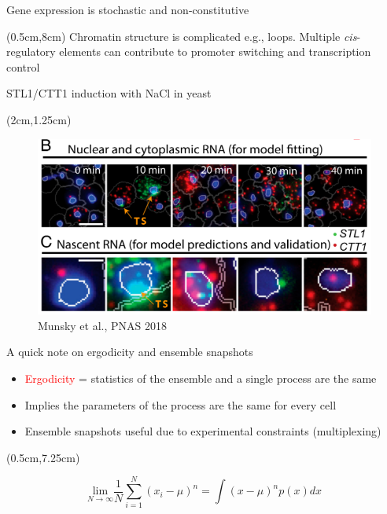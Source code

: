 \documentclass[aspectratio=1610]{beamer}					%
\begin{document}
\begin{frame}{Gene expression is stochastic and non-constitutive}
\begin{textblock*}{15cm}
\end{textblock*}

\begin{textblock*}{15cm}(0.5cm,8cm)
Chromatin structure is complicated e.g., loops. Multiple \emph{cis}-regulatory elements can contribute to promoter switching and transcription control
\end{textblock*}

\end{frame}

\begin{frame}{STL1/CTT1 induction with NaCl in yeast}
\begin{textblock*}{12cm}(2cm,1.25cm)
\begin{figure}
\includegraphics[width=12cm]{salt.png}
\caption{Munsky et al., PNAS 2018}
\end{figure}
\end{textblock*}
\end{frame}

\begin{frame}{A quick note on ergodicity and ensemble snapshots}
\begin{itemize}
\item \textcolor{red}{Ergodicity} = statistics of the ensemble and a single process are the same
\item Implies the parameters of the process are the same for every cell
\item Ensemble snapshots useful due to experimental constraints (multiplexing)
\end{itemize}
\begin{textblock*}{15cm}(0.5cm,7.25cm)

\begin{equation*}
\underset{N\rightarrow \infty}{\mathrm{lim}} \frac{1}{N}\sum_{i=1}^{N} (x_{i}-\mu)^{n} = \int (x-\mu)^{n} p(x)dx
\end{equation*}
\end{textblock*}

\end{frame}
\end{document}
